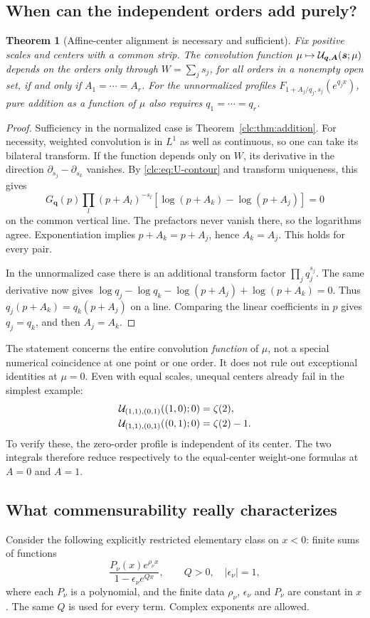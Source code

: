 \documentclass[11pt,a4paper]{article}
\numberwithin{equation}{section}
\newtheorem{theorem}{Theorem}[section]
\theoremstyle{definition}\newtheorem{definition}[theorem]{Definition}
\theoremstyle{remark}\newtheorem{remark}[theorem]{Remark}
\newcommand{\bq}{\boldsymbol q}\newcommand{\bs}{\boldsymbol s}
\newcommand{\bA}{\boldsymbol A}\newcommand{\bdelta}{\boldsymbol\delta}
\begin{document}
\subsection{When can the independent orders add purely?}
\begin{theorem}[Affine-center alignment is necessary and sufficient]
\label{clc:thm:alignment}
Fix positive scales and centers with a common strip. The convolution
function $\mu\mapsto\UU_{\bq,\bA}(\bs;\mu)$ depends on the orders only
through $W=\sum_js_j$, for all orders in a nonempty open set, if and
only if $A_1=\cdots=A_r$. For the \emph{unnormalized} profiles
$F_{1+A_j/q_j,s_j}(e^{q_jx})$, pure addition as a function of $\mu$
also requires $q_1=\cdots=q_r$.
\end{theorem}
\begin{proof}
Sufficiency in the normalized case is Theorem~\ref{clc:thm:addition}.
For necessity, weighted convolution is in $L^1$ as well as continuous,
so one can take its bilateral transform. If the function depends only
on $W$, its derivative in the direction
$\partial_{s_j}-\partial_{s_k}$ vanishes. By
\eqref{clc:eq:U-contour} and transform uniqueness, this gives
\[
 G_{\bq}(p)\prod_l(p+A_l)^{-s_l}
             [\log(p+A_k)-\log(p+A_j)]=0
\]
on the common vertical line. The prefactors never vanish there, so the
logarithms agree. Exponentiation implies $p+A_k=p+A_j$, hence
$A_k=A_j$. This holds for every pair.

In the unnormalized case there is an additional transform factor
$\prod_jq_j^{s_j}$. The same derivative now gives
$\log q_j-\log q_k-\log(p+A_j)+\log(p+A_k)=0$.
Thus $q_j(p+A_k)=q_k(p+A_j)$ on a line. Comparing the linear
coefficients in $p$ gives $q_j=q_k$, and then $A_j=A_k$.
\end{proof}

The statement concerns the entire convolution \emph{function} of $\mu$,
not a special numerical coincidence at one point or one order. It does
not rule out exceptional identities at $\mu=0$. Even with equal scales,
unequal centers already fail in the simplest example:
\begin{align*}
 \mathcal U_{(1,1),(0,1)}((1,0);0)&=\zeta(2),\\
 \mathcal U_{(1,1),(0,1)}((0,1);0)&=\zeta(2)-1.
\end{align*}
To verify these, the zero-order profile is independent of its center.
The two integrals therefore reduce respectively to the equal-center
weight-one formulas at $A=0$ and $A=1$.

\subsection{What commensurability really characterizes}
Consider the following explicitly restricted elementary class on $x<0$:
finite sums of functions
\begin{equation}\label{clc:eq:kernel-class}
 \frac{P_\nu(x)e^{\rho_\nu x}}
             {1-\epsilon_\nu e^{Qx}},
 \qquad Q>0,\quad |\epsilon_\nu|=1,
\end{equation}
where each $P_\nu$ is a polynomial, and the finite data $\rho_\nu$,
$\epsilon_\nu$ and $P_\nu$ are constant in $x$. The same $Q$ is used
for every term. Complex exponents are allowed.
\end{document}
